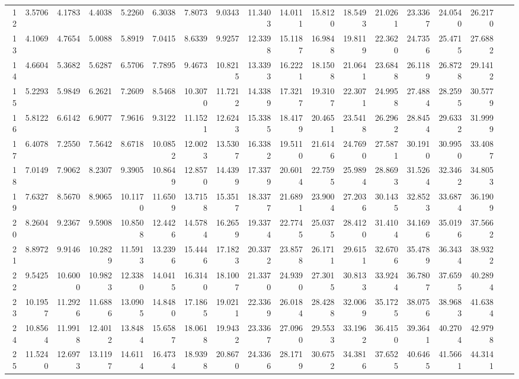 \begin{table}[ht]
\begin{sideways}
\begin{tabular}{r||rrrrrrrrrrrrrrrrr}
  12 & 3.5706 & 4.1783 & 4.4038 & 5.2260 & 6.3038 & 7.8073 & 9.0343 & 11.3403 & 14.0111 & 15.8120 & 18.5493 & 21.0261 & 23.3367 & 24.0540 & 26.2170 \\ 
  13 & 4.1069 & 4.7654 & 5.0088 & 5.8919 & 7.0415 & 8.6339 & 9.9257 & 12.3398 & 15.1187 & 16.9848 & 19.8119 & 22.3620 & 24.7356 & 25.4715 & 27.6882 \\ 
  14 & 4.6604 & 5.3682 & 5.6287 & 6.5706 & 7.7895 & 9.4673 & 10.8215 & 13.3393 & 16.2221 & 18.1508 & 21.0641 & 23.6848 & 26.1189 & 26.8728 & 29.1412 \\ 
  15 & 5.2293 & 5.9849 & 6.2621 & 7.2609 & 8.5468 & 10.3070 & 11.7212 & 14.3389 & 17.3217 & 19.3107 & 22.3071 & 24.9958 & 27.4884 & 28.2595 & 30.5779 \\ 
  16 & 5.8122 & 6.6142 & 6.9077 & 7.9616 & 9.3122 & 11.1521 & 12.6243 & 15.3385 & 18.4179 & 20.4651 & 23.5418 & 26.2962 & 28.8454 & 29.6332 & 31.9999 \\ 
  17 & 6.4078 & 7.2550 & 7.5642 & 8.6718 & 10.0852 & 12.0023 & 13.5307 & 16.3382 & 19.5110 & 21.6146 & 24.7690 & 27.5871 & 30.1910 & 30.9950 & 33.4087 \\ 
  18 & 7.0149 & 7.9062 & 8.2307 & 9.3905 & 10.8649 & 12.8570 & 14.4399 & 17.3379 & 20.6014 & 22.7595 & 25.9894 & 28.8693 & 31.5264 & 32.3462 & 34.8053 \\ 
  19 & 7.6327 & 8.5670 & 8.9065 & 10.1170 & 11.6509 & 13.7158 & 15.3517 & 18.3377 & 21.6891 & 23.9004 & 27.2036 & 30.1435 & 32.8523 & 33.6874 & 36.1909 \\ 
  20 & 8.2604 & 9.2367 & 9.5908 & 10.8508 & 12.4426 & 14.5784 & 16.2659 & 19.3374 & 22.7745 & 25.0375 & 28.4120 & 31.4104 & 34.1696 & 35.0196 & 37.5662 \\ 
  21 & 8.8972 & 9.9146 & 10.2829 & 11.5913 & 13.2396 & 15.4446 & 17.1823 & 20.3372 & 23.8578 & 26.1711 & 29.6151 & 32.6706 & 35.4789 & 36.3434 & 38.9322 \\ 
  22 & 9.5425 & 10.6000 & 10.9823 & 12.3380 & 14.0415 & 16.3140 & 18.1007 & 21.3370 & 24.9390 & 27.3015 & 30.8133 & 33.9244 & 36.7807 & 37.6595 & 40.2894 \\ 
  23 & 10.1957 & 11.2926 & 11.6886 & 13.0905 & 14.8480 & 17.1865 & 19.0211 & 22.3369 & 26.0184 & 28.4288 & 32.0069 & 35.1725 & 38.0756 & 38.9683 & 41.6384 \\ 
  24 & 10.8564 & 11.9918 & 12.4012 & 13.8484 & 15.6587 & 18.0618 & 19.9432 & 23.3367 & 27.0960 & 29.5533 & 33.1962 & 36.4150 & 39.3641 & 40.2704 & 42.9798 \\ 
  25 & 11.5240 & 12.6973 & 13.1197 & 14.6114 & 16.4734 & 18.9398 & 20.8670 & 24.3366 & 28.1719 & 30.6752 & 34.3816 & 37.6525 & 40.6465 & 41.5661 & 44.3141 \\ 

\end{tabular}
\end{sideways}
\end{table}
